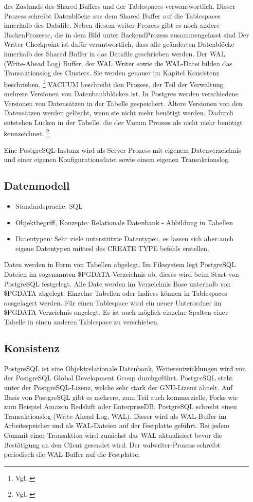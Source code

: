     des Zustands des Shared Buffers und der Tablespaces verwantwortlich. Dieser Prozess schreibt Datenblöcke aus dem Shared Buffer auf die Tablespaces innerhalb des Datafile. Neben diesem writer Prozess gibt es noch andere BackenProzesse, die in dem Bild unter BackendProzess zusammengefasst sind
    Der Writer Checkpoint ist dafür verantwortlich, dass alle geänderten Datenblöcke innerhalb des Shared Buffer in das Datafile geschrieben werden. Der WAL (Write-Ahead Log) Buffer, der WAL Writer sowie die WAL-Datei bilden das Transaktionslog des Clusters. Sie werden genauer im Kapitel Konsistenz beschrieben.
    \footnote{Vgl. \cite[Seite 26]{froehlich01}} VACUUM beschreibt den Prozess, der Teil der Verwaltung mehrere Versionen
von Datenbankblöcken ist. In Postgres werden verschiedene Versionen von Datensätzen in der Tabelle gespeichert. Ältere Versionen von den Datensätzen werden gelöscht, wenn sie nicht mehr benötigt werden. Dadurch entstehen
Lücken in der Tabelle, die der Vacum Prozess als nicht mehr benötigt kennzeichnet. \footnote{Vgl. \cite[Seite 37]{froehlich01}}

    Eine PostgreSQL-Instanz wird als Server Prozess mit eigenem Datenverzeichnis und einer eigenen Konfigurationsdatei sowie einem eigenen Transaktionslog.
\subsection{Datenmodell}
    \begin{itemize}
        \item Standardsprache: SQL
        \item Objektbegriff, Konzepte: Relationale Datenbank - Abbildung in Tabellen
        \item Datentypen:
        \subitem Sehr viele unterstützte Datentypen, es lassen sich aber auch eigene Datentypen mittesl des CREATE TYPE befehls erstellen.\cite{postgres8}
    \end{itemize}
    Daten werden in Form von Tabellen abgelegt. Im Filesystem legt PostgreSQL Dateien im sogenannten \$PGDATA-Verzeichnis ab, dieses wird beim Start von PostgreSQL festgelegt. Alle Date werden im Verzeichnis Base unterhalb von \$PGDATA abgelegt. Einzelne Tabellen oder Indices können in Tablespaces ausgelagert werden. Für einen Tablespace wird ein neuer Unterordner im \$PGDATA-Verzeichnis angelegt. Es ist auch möglich einzelne Spalten einer Tabelle in einen anderen Tablespace zu verschieben.
\subsection{Konsistenz}
PostgreSQL ist eine Objektrelationale Datenbank. Weiterentwicklungen wird von der PostgreSQL Global Development Group durchgeführt. PostgreSQL steht unter der PostgreSQL-Lizenz, welche sehr stark der GNU-Lizenz ähnelt. Auf Basis von PostgreSQL gibt es mehrere, zum Teil auch kommerzielle, Forks wie zum Beispiel Amazon Redshift oder EnterpriseDB.
PostgreSQL schreibt einen Transaktionslog (Write-Ahead Log, WAL).
Dieser wird als WAL-Buffer im Arbeitsspeicher und als WAL-Dateien auf der Festplatte geführt.
Bei jedem Commit einer Transaktion wird zunächst das WAL aktualisiert bevor die Bestätigung an den Client gesendet wird.
Der walwriter-Prozess schreibt periodisch die WAL-Buffer auf die Festplatte.
